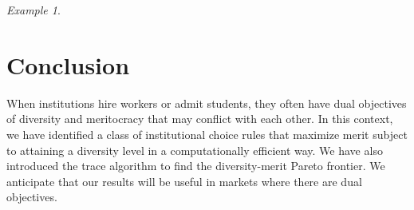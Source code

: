 \documentclass[12pt]{amsart}
\theoremstyle{remark}
\newtheorem{example}{Example}
\begin{document}
\begin{example}
\begin{comment}
\begin{figure}[htb]
    \centering
\definecolor{wrwrwr}{rgb}{0.3803921568627451,0.3803921568627451,0.3803921568627451}
\definecolor{rvwvcq}{rgb}{0.40784313725490196,0.40784313725490196,0.40784313725490196}
\begin{tikzpicture}[scale=.9]
\begin{axis}[
x=1.0cm,y=1.0cm,
axis lines=middle,
xmin=-1.5,
xmax=11.0,
ymin=-1.5,
ymax=8.0,
xtick=\empty,
ytick=\empty,
]
\draw (1.4,7.72) node[anchor=north west] {$\{x,y\}$};
\draw [line width=0.8pt,dash pattern=on 1pt off 1pt,color=wrwrwr] (5.,0.)-- (5.,5.);
\draw [line width=0.8pt,dash pattern=on 1pt off 1pt,color=wrwrwr] (5.,5.)-- (0.,5.);
\draw (4.4,5.72) node[anchor=north west] {$\{x,z\}$};
\draw [line width=0.8pt,dash pattern=on 1pt off 1pt,color=wrwrwr] (8.,0.)-- (8.,2.);
\draw [line width=0.8pt,dash pattern=on 1pt off 1pt,color=wrwrwr] (8.,2.)-- (0.,2.);
\draw (7.55,2.72) node[anchor=north west] {$\{z\}$};
\draw [line width=0.8pt,dash pattern=on 1pt off 1pt,color=wrwrwr] (2.,0.)-- (2.,7.);
\draw [line width=0.8pt,dash pattern=on 1pt off 1pt,color=wrwrwr] (2.,7.)-- (0.,7.);
\draw (1.75,-0.1) node[anchor=north west] {2};
\draw (4.75,-0.1) node[anchor=north west] {5};
\draw (7.75,-0.2) node[anchor=north west] {$n$};
\draw (9.20, -0.1) node[anchor=north west] {diversity};
\draw (-1.3, 8.0) node[anchor=north west] {merit};
\begin{scriptsize}
\draw [fill=rvwvcq] (5.,5.) circle (2.5pt);
\draw [fill=rvwvcq] (8.,2.) circle (2.5pt);
\draw [fill=rvwvcq] (2.,7.) circle (2.5pt);
\end{scriptsize}
\end{axis}
\end{tikzpicture}
\caption{Diversity-meritocracy Pareto frontier in Example \ref{ex:frontier} when $n>5$.}
\label{fig:frontier}
\end{figure}
\end{comment}
\end{example}






\section{Conclusion}\label{sec:conclusion}
When institutions hire workers or admit students, they often
have dual objectives of diversity and meritocracy that may
conflict with each other. In this context, we have identified
a class of institutional choice rules that maximize merit
subject to attaining a diversity level in a computationally efficient
way. We have also introduced the trace algorithm to find the diversity-merit
Pareto frontier. We anticipate that our results
will be useful in markets where there are dual objectives.
\end{document}
